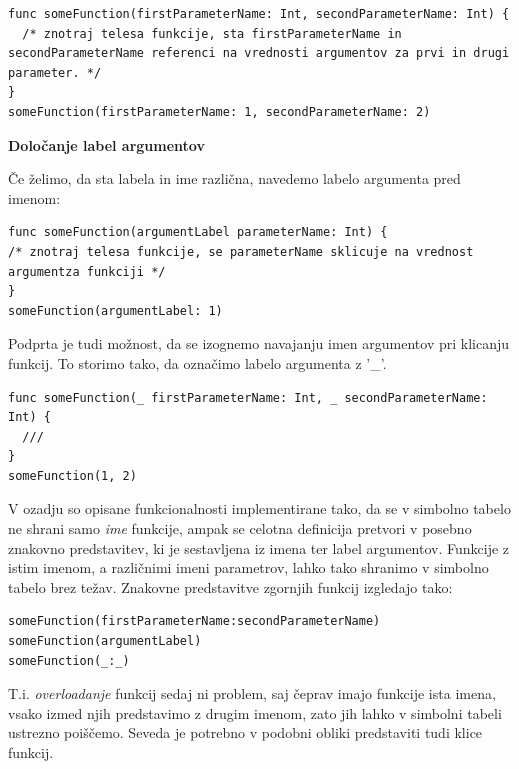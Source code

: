\documentclass[a4paper, 12pt]{book}
\begin{document}
\begin{lstlisting}[caption={Primer definicije in klica funkcije}, captionpos=b]
func someFunction(firstParameterName: Int, secondParameterName: Int) {
  /* znotraj telesa funkcije, sta firstParameterName in secondParameterName referenci na vrednosti argumentov za prvi in drugi parameter. */
}
someFunction(firstParameterName: 1, secondParameterName: 2)
\end{lstlisting}
\newpage

\textbf{Določanje label argumentov}

Če želimo, da sta labela in ime različna, navedemo labelo argumenta pred imenom:

\begin{lstlisting}[caption={Labela argumenta in ime parametra se razlikujeta}, captionpos=b]
func someFunction(argumentLabel parameterName: Int) {
/* znotraj telesa funkcije, se parameterName sklicuje na vrednost argumentza funkciji */
}
someFunction(argumentLabel: 1) 
\end{lstlisting}

Podprta je tudi možnost, da se izognemo navajanju imen argumentov pri klicanju funkcij. To storimo tako, da označimo labelo argumenta z '\_'.

\begin{lstlisting}[caption={}, captionpos=b]
func someFunction(_ firstParameterName: Int, _ secondParameterName: Int) {
  ///
}
someFunction(1, 2)
\end{lstlisting}

V ozadju so opisane funkcionalnosti implementirane tako, da se v simbolno tabelo ne shrani samo \textit{ime} funkcije, ampak se celotna definicija pretvori v posebno znakovno predstavitev, ki je sestavljena iz imena ter label argumentov. Funkcije z istim imenom, a različnimi imeni parametrov, lahko tako shranimo v simbolno tabelo brez težav. Znakovne predstavitve zgornjih funkcij izgledajo tako:

\begin{lstlisting}[caption={Znakovne predstavitve funkcij}, captionpos=b]
someFunction(firstParameterName:secondParameterName)
someFunction(argumentLabel)
someFunction(_:_)
\end{lstlisting}

T.i. \textit{overloadanje} funkcij sedaj ni problem, saj čeprav imajo funkcije ista imena, vsako izmed njih predstavimo z drugim imenom, zato jih lahko v simbolni tabeli ustrezno poiščemo. Seveda je potrebno v podobni obliki predstaviti tudi klice funkcij.
\end{document}
